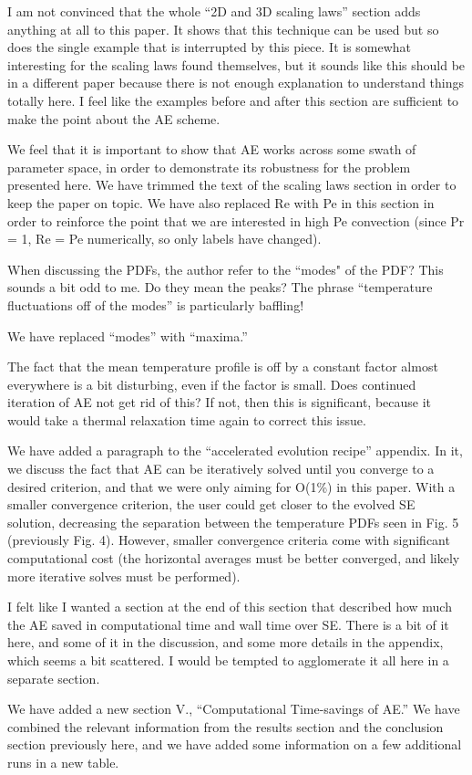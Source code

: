 \documentclass[aps, 11pt, singlecolumn]{revtex4-1} %
\begin{document}
\begin{singlespace}
\begin{myquotation}
I am not convinced that the whole ``2D and 3D scaling laws'' section
adds anything at all to this paper. It shows that this technique can
be used but so does the single example that is interrupted by this
piece. It is somewhat interesting for the scaling laws found
themselves, but it sounds like this should be in a different paper
because there is not enough explanation to understand things totally
here. I feel like the examples before and after this section are
sufficient to make the point about the AE scheme.
\end{myquotation}
We feel that it is important to show that AE works across some swath of parameter
space, in order to demonstrate its robustness for the problem presented here.
We have trimmed the text of the scaling laws section in
order to keep the paper on topic. We have also replaced Re with Pe in this
section in order to reinforce the point that we are interested in high Pe
convection (since Pr = 1, Re = Pe numerically, so only labels have changed).

\begin{myquotation}
When discussing the PDFs, the author refer to the ``modes" of the PDF?
This sounds a bit odd to me. Do they mean the peaks? The phrase
``temperature fluctuations off of the modes'' is particularly baffling!
\end{myquotation}
We have replaced ``modes'' with ``maxima.''

\begin{myquotation}
The fact that the mean temperature profile is off by a constant factor
almost everywhere is a bit disturbing, even if the factor is small.
Does continued iteration of AE not get rid of this? If not, then this
is significant, because it would take a thermal relaxation time again
to correct this issue.
\end{myquotation}
We have added a paragraph to the ``accelerated evolution recipe'' appendix.
In it, we discuss the fact that AE can be iteratively solved until you converge
to a desired criterion, and that we were only aiming for O(1\%) in this
paper. With a smaller convergence criterion, the user
could get closer to the evolved SE solution, decreasing the separation
between the temperature PDFs seen in Fig. 5 (previously Fig. 4). 
However, smaller convergence criteria
come with significant computational cost (the horizontal averages must be
better converged, and likely more iterative solves must be performed). 

\begin{myquotation}
I felt like I wanted a section at the end of this section that
described how much the AE saved in computational time and wall time
over SE. There is a bit of it here, and some of it in the discussion,
and some more details in the appendix, which seems a bit scattered. I
would be tempted to agglomerate it all here in a separate section.
\end{myquotation}
We have added a new section V., ``Computational Time-savings of AE.''
We have combined the relevant information from the results section and the 
conclusion section previously here, and we have added some information on a few
additional runs in a new table. 


\end{singlespace}
\end{document}
